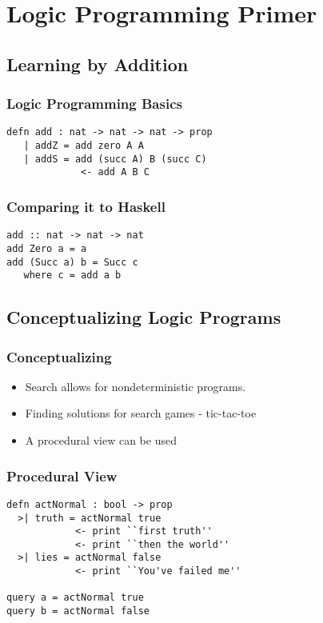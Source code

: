 \section[Logic Primer]{Logic Programming Primer}

\subsection[Basics]{Learning by Addition}

\begin{frame}[fragile]
\frametitle{Logic Programming Basics}

\begin{lstlisting}
defn add : nat -> nat -> nat -> prop
   | addZ = add zero A A
   | addS = add (succ A) B (succ C) 
             <- add A B C
\end{lstlisting}
\end{frame}


\begin{frame}[fragile]
\frametitle{Comparing it to Haskell}

\begin{lstlisting}
add :: nat -> nat -> nat
add Zero a = a
add (Succ a) b = Succ c
   where c = add a b
\end{lstlisting}
\end{frame}

\subsection[Conceptualizing]{Conceptualizing Logic Programs}

\begin{frame}
\frametitle{Conceptualizing}
\begin{itemize}
\item Search allows for nondeterministic programs.
\item Finding solutions for search games - tic-tac-toe
\item A procedural view can be used
\end{itemize}
\end{frame}


\begin{frame}[fragile]
\frametitle{Procedural View}

\begin{lstlisting}
defn actNormal : bool -> prop
  >| truth = actNormal true 
            <- print ``first truth''
            <- print ``then the world''
  >| lies = actNormal false
            <- print ``You've failed me''

query a = actNormal true
query b = actNormal false
\end{lstlisting}
\end{frame}

